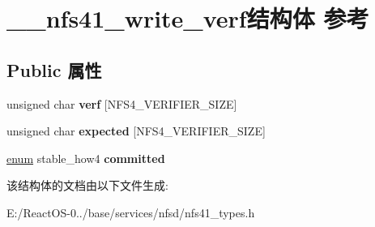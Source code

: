 \hypertarget{struct____nfs41__write__verf}{}\section{\+\_\+\+\_\+nfs41\+\_\+write\+\_\+verf结构体 参考}
\label{struct____nfs41__write__verf}
\subsection*{Public 属性}
\begin{DoxyCompactItemize}
\item 
\mbox{\label{struct____nfs41__write__verf_a38b5a637ffa0c0ce4b0aae2f4548c1c5}} 
unsigned char {\bfseries verf} \mbox{[}N\+F\+S4\+\_\+\+V\+E\+R\+I\+F\+I\+E\+R\+\_\+\+S\+I\+ZE\mbox{]}
\item 
\mbox{\label{struct____nfs41__write__verf_a97aaccf0f2cfc50f0b8578cf53cc1421}} 
unsigned char {\bfseries expected} \mbox{[}N\+F\+S4\+\_\+\+V\+E\+R\+I\+F\+I\+E\+R\+\_\+\+S\+I\+ZE\mbox{]}
\item 
\mbox{\label{struct____nfs41__write__verf_a2a410095c59749f47573bffdcc440b1d}} 
\hyperlink{interfaceenum}{enum} stable\+\_\+how4 {\bfseries committed}
\end{DoxyCompactItemize}


该结构体的文档由以下文件生成\+:\begin{DoxyCompactItemize}
\item 
E\+:/\+React\+O\+S-\/0../base/services/nfsd/nfs41\+\_\+types.\+h\end{DoxyCompactItemize}
